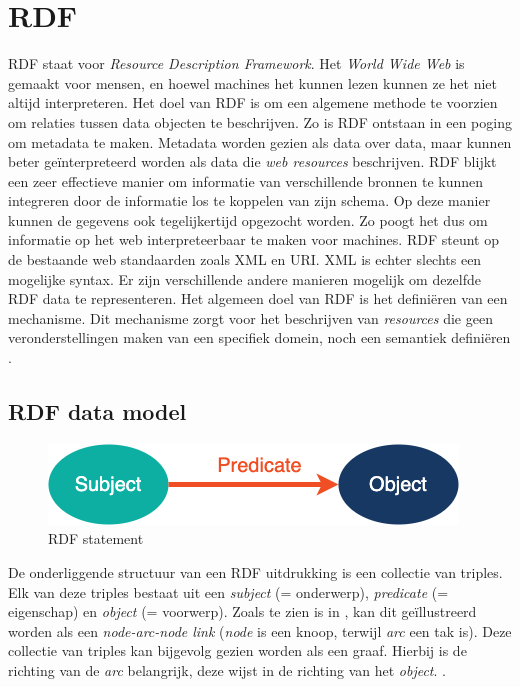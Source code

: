 \section{RDF}
\label{sec:rdf}

RDF staat voor \textit{Resource Description Framework}. Het \textit{World Wide Web} is gemaakt voor mensen, en hoewel machines het kunnen lezen kunnen ze het niet altijd interpreteren. Het doel van RDF is om een algemene methode te voorzien om relaties tussen data objecten te beschrijven. Zo is RDF ontstaan in een poging om metadata te maken. Metadata worden gezien als data over data, maar kunnen beter geïnterpreteerd worden als data die \textit{web resources} beschrijven. RDF blijkt een zeer effectieve manier om informatie van verschillende bronnen te kunnen integreren door de informatie los te koppelen van zijn schema. Op deze manier kunnen de gegevens ook tegelijkertijd opgezocht worden. Zo poogt het dus om informatie op het web interpreteerbaar te maken voor machines. RDF steunt op de bestaande web standaarden zoals XML en URI. XML is echter slechts een mogelijke syntax. Er zijn verschillende andere manieren mogelijk om dezelfde RDF data te representeren. Het algemeen doel van RDF is het definiëren van een mechanisme. Dit mechanisme zorgt voor het beschrijven van \textit{resources} die geen veronderstellingen maken van een specifiek domein, noch een semantiek definiëren \cite{lassila1998resource}.

\subsection{RDF data model}
\begin{figure}
    \centering
    \includegraphics[width=0.5\linewidth]{images/spo.png}
    \caption{RDF statement}
    \label{fig:spo}
\end{figure}

De onderliggende structuur van een RDF uitdrukking is een collectie van triples. Elk van deze triples bestaat uit een \textit{subject} (= onderwerp), \textit{predicate} (= eigenschap) en \textit{object} (= voorwerp). Zoals te zien is in , kan dit geïllustreerd worden als een \textit{node-arc-node link} (\textit{node} is een knoop, terwijl \textit{arc} een tak is). Deze collectie van triples kan bijgevolg gezien worden als een graaf. Hierbij is de richting van de \textit{arc} belangrijk, deze wijst in de richting van het \textit{object}. \cite{klyne2009resource}.

